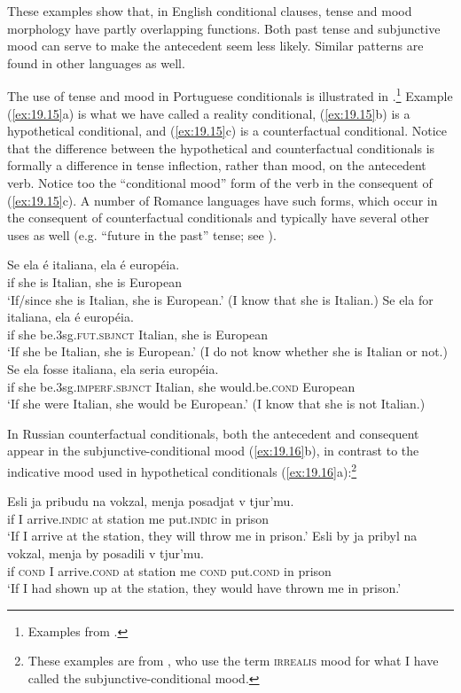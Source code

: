 These examples show that, in English conditional clauses, tense and mood morphology have partly overlapping functions. Both past tense and subjunctive mood can serve to make the antecedent seem less likely. Similar patterns are found in other languages as well.



The use of tense and mood in Portuguese conditionals is illustrated in .\footnote{Examples from \citet{Gomes2008}.} Example (\ref{ex:19.15}a) is what we have called a reality conditional, (\ref{ex:19.15}b) is a hypothetical conditional, and (\ref{ex:19.15}c) is a counterfactual conditional. Notice that the difference between the hypothetical and counterfactual conditionals is formally a difference in tense inflection, rather than mood, on the antecedent verb. Notice too the “conditional mood” form of the verb in the consequent of (\ref{ex:19.15}c). A number of Romance languages have such forms, which occur in the consequent of counterfactual conditionals and typically have several other uses as well (e.g. “future in the past” tense; see ).


\ea \label{ex:19.15}
\ea  \gll Se  ela  é  italiana,  ela  é  européia.\\
if  she  is  Italian,  she  is  European\\
\glt ‘If/since she is Italian, she is European.’ (I know that she is Italian.)
\ex \gll Se  ela  for  italiana,  ela  é  européia.\\
if  she  be.3sg.\textsc{fut.sbjnct}  Italian,  she  is  European\\
\glt ‘If she be Italian, she is European.’ (I do not know whether she is Italian or not.)
\ex \gll  Se  ela  fosse  italiana,  ela  seria  européia.\\
if  she  be.3sg.\textsc{imperf.sbjnct}  Italian,  she  would.be.\textsc{cond}  European\\
\glt ‘If she were Italian, she would be European.’ (I know that she is not Italian.)
\z \z


In Russian counterfactual conditionals, both the antecedent and consequent appear in the subjunctive-conditional mood (\ref{ex:19.16}b), in contrast to the indicative mood used in hypothetical conditionals (\ref{ex:19.16}a):\footnote{These examples are from \citet[251]{ChungTimberlake1985}, who use the term \textsc{irrealis} mood for what I have called the subjunctive-conditional mood.}


\ea \label{ex:19.16}
\ea  \gll Esli  ja  pribudu  na  vokzal,  menja  posadjat  v  tjur’mu.\\
if  I  arrive.\textsc{indic}  at  station  me  put.\textsc{indic}  in  prison\\
\glt ‘If I arrive at the station, they will throw me in prison.’ 
\ex \gll Esli  by  ja  pribyl  na  vokzal,  menja  by  posadili  v  tjur’mu.\\
if  \textsc{cond}  I  arrive.\textsc{cond}  at  station  me  \textsc{cond}  put.\textsc{cond}  in  prison\\
\glt ‘If I had shown up at the station, they would have thrown me in prison.’
\z \z


